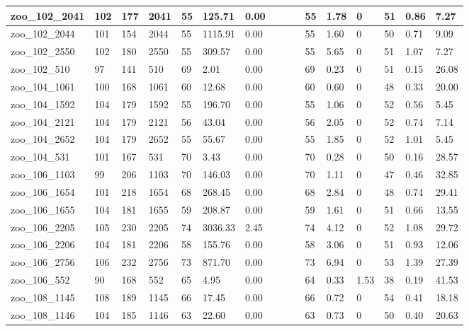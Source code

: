 \begin{landscape}
\begin{longtable}{llllllllllllllll}
zoo\_102\_2041 & 102 & 177 & 2041 & 55 & 125.71 & 0.00 &  &  &  & 55 & 1.78 & 0 & 51 & 0.86 & 7.27 \\ \hline 
zoo\_102\_2044 & 101 & 154 & 2044 & 55 & 1115.91 & 0.00 &  &  &  & 55 & 1.60 & 0 & 50 & 0.71 & 9.09 \\ \hline 
zoo\_102\_2550 & 102 & 180 & 2550 & 55 & 309.57 & 0.00 &  &  &  & 55 & 5.65 & 0 & 51 & 1.07 & 7.27 \\ \hline 
zoo\_102\_510 & 97 & 141 & 510 & 69 & 2.01 & 0.00 &  &  &  & 69 & 0.23 & 0 & 51 & 0.15 & 26.08 \\ \hline 
zoo\_104\_1061 & 100 & 168 & 1061 & 60 & 12.68 & 0.00 &  &  &  & 60 & 0.60 & 0 & 48 & 0.33 & 20.00 \\ \hline 
zoo\_104\_1592 & 104 & 179 & 1592 & 55 & 196.70 & 0.00 &  &  &  & 55 & 1.06 & 0 & 52 & 0.56 & 5.45 \\ \hline 
zoo\_104\_2121 & 104 & 179 & 2121 & 56 & 43.04 & 0.00 &  &  &  & 56 & 2.05 & 0 & 52 & 0.74 & 7.14 \\ \hline 
zoo\_104\_2652 & 104 & 179 & 2652 & 55 & 55.67 & 0.00 &  &  &  & 55 & 1.85 & 0 & 52 & 1.01 & 5.45 \\ \hline 
zoo\_104\_531 & 101 & 167 & 531 & 70 & 3.43 & 0.00 &  &  &  & 70 & 0.28 & 0 & 50 & 0.16 & 28.57 \\ \hline 
zoo\_106\_1103 & 99 & 206 & 1103 & 70 & 146.03 & 0.00 &  &  &  & 70 & 1.11 & 0 & 47 & 0.46 & 32.85 \\ \hline 
zoo\_106\_1654 & 101 & 218 & 1654 & 68 & 268.45 & 0.00 &  &  &  & 68 & 2.84 & 0 & 48 & 0.74 & 29.41 \\ \hline 
zoo\_106\_1655 & 104 & 181 & 1655 & 59 & 208.87 & 0.00 &  &  &  & 59 & 1.61 & 0 & 51 & 0.66 & 13.55 \\ \hline 
zoo\_106\_2205 & 105 & 230 & 2205 & 74 & 3036.33 & 2.45 &  &  &  & 74 & 4.12 & 0 & 52 & 1.08 & 29.72 \\ \hline 
zoo\_106\_2206 & 104 & 181 & 2206 & 58 & 155.76 & 0.00 &  &  &  & 58 & 3.06 & 0 & 51 & 0.93 & 12.06 \\ \hline 
zoo\_106\_2756 & 106 & 232 & 2756 & 73 & 871.70 & 0.00 &  &  &  & 73 & 6.94 & 0 & 53 & 1.39 & 27.39 \\ \hline 
zoo\_106\_552 & 90 & 168 & 552 & 65 & 4.95 & 0.00 &  &  &  & 64 & 0.33 & 1.53 & 38 & 0.19 & 41.53 \\ \hline 
zoo\_108\_1145 & 108 & 189 & 1145 & 66 & 17.45 & 0.00 &  &  &  & 66 & 0.72 & 0 & 54 & 0.41 & 18.18 \\ \hline 
zoo\_108\_1146 & 104 & 185 & 1146 & 63 & 22.60 & 0.00 &  &  &  & 63 & 0.73 & 0 & 50 & 0.40 & 20.63 \\ \hline 

\end{longtable}
\end{landscape}
